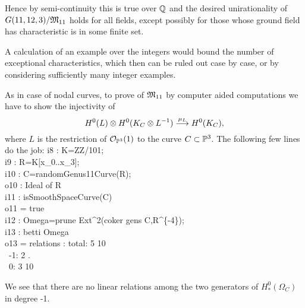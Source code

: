 Hence by semi-continuity this is true over ${\mathbb Q}$ and the
desired unirationality of $G(11,12,3)/\mathfrak M_{11}$ holds for all fields,
except possibly for those whose ground field has characteristic is in some finite set.

A calculation of an example over the integers
would bound the number of exceptional characteristics, 
which then can be ruled out case by case, 
or by considering sufficiently many integer examples.

As in case of nodal curves, to prove  of $\mathfrak M_{11}$ by computer
aided computations we have to show the injectivity of
$$
H^0(L)\otimes H^0(K_{C}\otimes L^{-1}) \stackrel{\mu_L}{\longrightarrow}H^0(K_{C}),
$$
where $L$ is the restriction of ${\mathcal O}_{{\mathbb P}^3}(1)$ to the curve $C\subset {\mathbb P}^3$.
The following few lines do the job:
\beginOutput
i8 : K=ZZ/101;\\
\endOutput
\beginOutput
i9 : R=K[x_0..x_3];\\
\endOutput
\beginOutput
i10 : C=randomGenus11Curve(R);\\
\emptyLine
o10 : Ideal of R\\
\endOutput
\beginOutput
i11 : isSmoothSpaceCurve(C)\\
\emptyLine
o11 = true\\
\endOutput
\beginOutput
i12 : Omega=prune Ext^2(coker gens C,R^\{-4\});\\
\endOutput
\beginOutput
i13 : betti Omega\\
\emptyLine
o13 = relations : total: 5 10\\
\                     -1: 2  .\\
\                      0: 3 10\\
\endOutput

\noindent
We see that there are no linear relations among the two generators
of $H^0_*(\Omega_C)$ in degree -1.





